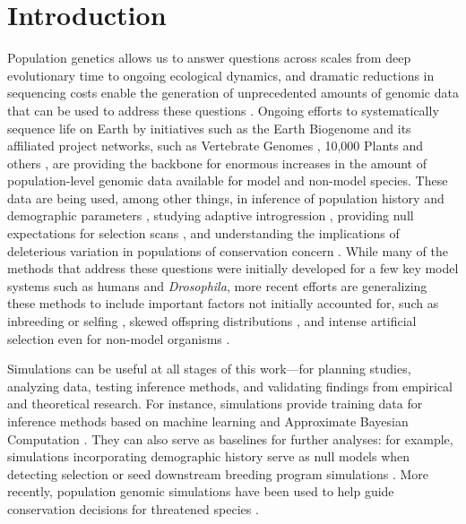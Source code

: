 \documentclass[hidelinks]{article}
\begin{document}
\section*{Introduction}
    \label{introduction}

Population genetics allows us to answer questions across scales from deep evolutionary time to ongoing ecological dynamics,
and dramatic reductions in sequencing costs enable the generation of
unprecedented amounts of genomic data that can be used to address these questions \citep{Ellegren2014}.
Ongoing efforts to systematically sequence life on
Earth by initiatives such as the Earth Biogenome \citep{Lewin2022} and its
affiliated project networks, such as Vertebrate Genomes
\citep{Rhie2021}, 10,000 Plants \citep{Cheng2018} and others \citep{darwin2022sequence},
are providing the backbone for enormous increases in the amount of population-level genomic data available for model and non-model species.
These data are being used, among other things,
in inference of population history and demographic parameters \citep{Beichman2018},
studying adaptive introgression \citep{Gower2021},
providing null expectations for selection scans \citep[e.g.][]{Hsieh2021},
and understanding the implications of deleterious variation in populations of conservation concern \citep[e.g.][]{Robinson2023}.
While many of the methods that address these questions were initially developed for a few key model systems such as humans and \emph{Drosophila},
more recent efforts are generalizing these methods to include 
important factors not initially accounted for,
such as inbreeding or selfing \citep{Blischak2020},
skewed offspring distributions \citep{Montano2016},
and intense artificial selection
even for non-model organisms \citep{MacLeod2013, MacLeod2014}.

Simulations can be useful at all stages of this work---for
planning studies, analyzing data, testing inference methods,
and validating findings from empirical and theoretical research.
For instance, simulations provide training data
for inference methods based on machine learning \citep{Schrider2018} and
Approximate Bayesian Computation \citep{Csillery2010}. They can also serve as
baselines for further analyses: for example, simulations incorporating
demographic history serve as null models when detecting selection \citep{Hsieh2016a}
or seed downstream breeding program simulations \citep{Gaynor2020}.
More recently, population genomic simulations have been used to help guide conservation decisions for threatened species
\citep{Teixeira2021,kyriazis2022using}.
\end{document}
